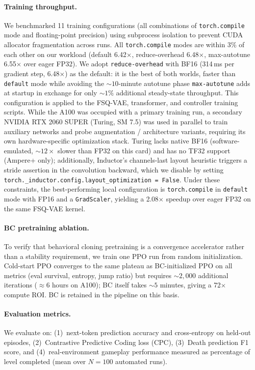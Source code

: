 \documentclass{article}
\begin{document}
\paragraph{Training throughput.}
We benchmarked 11 training configurations (all combinations of \texttt{torch.compile} mode and floating-point precision) using subprocess isolation to prevent CUDA allocator fragmentation across runs.
All \texttt{torch.compile} modes are within 3\% of each other on our workload (default 6.42$\times$, reduce-overhead 6.48$\times$, max-autotune 6.55$\times$ over eager FP32).
We adopt \texttt{reduce-overhead} with BF16 (314\,ms per gradient step, 6.48$\times$) as the default: it is the best of both worlds, faster than \texttt{default} mode while avoiding the ${\sim}10$-minute autotune phase \texttt{max-autotune} adds at startup in exchange for only ${\sim}1\%$ additional steady-state throughput.
This configuration is applied to the FSQ-VAE, transformer, and controller training scripts.
While the A100 was occupied with a primary training run, a secondary NVIDIA RTX 2060 SUPER (Turing, SM 7.5) was used in parallel to train auxiliary networks and probe augmentation / architecture variants, requiring its own hardware-specific optimization stack.
Turing lacks native BF16 (software-emulated, ${\sim}12\times$ slower than FP32 on this card) and has no TF32 support (Ampere+ only); additionally, Inductor's channels-last layout heuristic triggers a stride assertion in the convolution backward, which we disable by setting \texttt{torch.\_inductor.config.layout\_optimization = False}.
Under these constraints, the best-performing local configuration is \texttt{torch.compile} in \texttt{default} mode with FP16 and a \texttt{GradScaler}, yielding a 2.08$\times$ speedup over eager FP32 on the same FSQ-VAE kernel.

\paragraph{BC pretraining ablation.}
To verify that behavioral cloning pretraining is a convergence accelerator rather than a stability requirement, we train one PPO run from random initialization.
Cold-start PPO converges to the same plateau as BC-initialized PPO on all metrics (eval survival, entropy, jump ratio) but requires ${\sim}2{,}000$ additional iterations (${\approx}6$ hours on A100); BC itself takes ${\sim}5$ minutes, giving a 72$\times$ compute ROI.
BC is retained in the pipeline on this basis.

\paragraph{Evaluation metrics.}
We evaluate on: (1)~next-token prediction accuracy and cross-entropy on held-out episodes, (2)~Contrastive Predictive Coding loss (CPC), (3)~Death prediction F1 score, and (4)~real-environment gameplay performance measured as percentage of level completed (mean over $N = 100$ automated runs).
\end{document}
